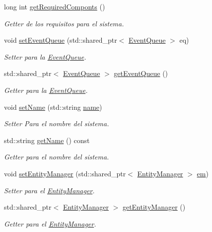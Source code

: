 \begin{DoxyCompactItemize}
long int \hyperlink{classant_1_1_system_a2d94338969f43d4fd2fd972deb099258}{get\+Required\+Componts} ()
\begin{DoxyCompactList}\small\item\em Getter de los requisitos para el sistema. \end{DoxyCompactList}\item 
void \hyperlink{classant_1_1_system_a1effe9f0e5615e516a34be02d5895434}{set\+Event\+Queue} (std\+::shared\+\_\+ptr$<$ \hyperlink{classant_1_1_event_queue}{Event\+Queue} $>$ eq)
\begin{DoxyCompactList}\small\item\em Setter para la \hyperlink{classant_1_1_event_queue}{Event\+Queue}. \end{DoxyCompactList}\item 
std\+::shared\+\_\+ptr$<$ \hyperlink{classant_1_1_event_queue}{Event\+Queue} $>$ \hyperlink{classant_1_1_system_ac3e2bbbdb622276d194ad3a687d8e4f1}{get\+Event\+Queue} ()
\begin{DoxyCompactList}\small\item\em Getter para la \hyperlink{classant_1_1_event_queue}{Event\+Queue}. \end{DoxyCompactList}\item 
void \hyperlink{classant_1_1_system_a231f9fc93b55ee67deb9597ae6be13ba}{set\+Name} (std\+::string \hyperlink{classant_1_1_system_a60b3c00a760a3b4947ab1f1fc534a5b2}{name})
\begin{DoxyCompactList}\small\item\em Setter Para el nombre del sistema. \end{DoxyCompactList}\item 
std\+::string \hyperlink{classant_1_1_system_a52a559b2c3ddbec5c846df1badd7f7f8}{get\+Name} () const 
\begin{DoxyCompactList}\small\item\em Getter para el nombre del sistema. \end{DoxyCompactList}\item 
void \hyperlink{classant_1_1_system_a1f983382d142ea697f1811f7f6f6ab17}{set\+Entity\+Manager} (std\+::shared\+\_\+ptr$<$ \hyperlink{classant_1_1_entity_manager}{Entity\+Manager} $>$ \hyperlink{classant_1_1_system_a5661d872ff769be150bd4e9a9552f6b9}{em})
\begin{DoxyCompactList}\small\item\em Setter para el \hyperlink{classant_1_1_entity_manager}{Entity\+Manager}. \end{DoxyCompactList}\item 
std\+::shared\+\_\+ptr$<$ \hyperlink{classant_1_1_entity_manager}{Entity\+Manager} $>$ \hyperlink{classant_1_1_system_adaad2087de7fc71924cfb5b134014b0a}{get\+Entity\+Manager} ()
\begin{DoxyCompactList}\small\item\em Getter para el \hyperlink{classant_1_1_entity_manager}{Entity\+Manager}. \end{DoxyCompactList}\end{DoxyCompactItemize}
